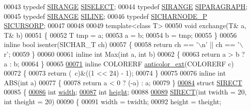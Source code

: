 \begin{DoxyCode}
00043 \textcolor{keyword}{typedef} \hyperlink{struct_s_i_r_a_n_g_e}{SIRANGE} \hyperlink{struct_s_i_r_a_n_g_e}{SISELECT};
00044 \textcolor{keyword}{typedef} \hyperlink{struct_s_i_r_a_n_g_e}{SIRANGE} \hyperlink{struct_s_i_r_a_n_g_e}{SIPARAGRAPH};
00045 \textcolor{keyword}{typedef} \hyperlink{struct_s_i_r_a_n_g_e}{SIRANGE} \hyperlink{struct_s_i_r_a_n_g_e}{SILINE};
00046 \textcolor{keyword}{typedef} \hyperlink{class_s_i_c_h_a_r_n_o_d_e}{SICHARNODE\_P} \hyperlink{class_s_i_c_h_a_r_n_o_d_e}{SICURSORP};
00047 
00048 
00049 \textcolor{keyword}{template}<\textcolor{keyword}{class} T>
00050 \textcolor{keywordtype}{void} exchange(T& a, T& b)
00051 \{
00052     T tmp = a;
00053     a = b;
00054     b = tmp;
00055 \}
00056 \textcolor{keyword}{inline} \textcolor{keywordtype}{bool} isenter(SICHAR\_T ch)
00057 \{
00058     \textcolor{keywordflow}{return} ch == \textcolor{charliteral}{'\(\backslash\)n'} || ch == \textcolor{charliteral}{'\(\backslash\)r'};
00059 \}
00060 
00061 \textcolor{keyword}{inline} \textcolor{keywordtype}{int} Max(\textcolor{keywordtype}{int} a, \textcolor{keywordtype}{int} b)
00062 \{
00063     \textcolor{keywordflow}{return} a > b ? a : b;
00064 \}
00065 
\hyperlink{kernal_8h_abd07a7735390aea7bf376c2bcc75bd96}{00071} \textcolor{keyword}{inline} COLORERF \hyperlink{kernal_8h_abd07a7735390aea7bf376c2bcc75bd96}{anticolor\_ext}(COLORERF c)
00072 \{
00073     \textcolor{keywordflow}{return} (~c)&((1 << 24) - 1);
00074 \}
00075 
00076 \textcolor{keyword}{inline} \textcolor{keywordtype}{int} ABS(\textcolor{keywordtype}{int} a)
00077 \{
00078     \textcolor{keywordflow}{return} a < 0 ? (-a) : a;
00079 \}
\hyperlink{struct_s_i_r_e_c_t}{00084} \textcolor{keyword}{struct }\hyperlink{struct_s_i_r_e_c_t}{SIRECT}
00085 \{
\hyperlink{struct_s_i_r_e_c_t_a99dbd77d045cc587f0c1f40bbba99ac8}{00086}     \textcolor{keywordtype}{int} \hyperlink{struct_s_i_r_e_c_t_a99dbd77d045cc587f0c1f40bbba99ac8}{width}; 
\hyperlink{struct_s_i_r_e_c_t_a6577f3092897d4bef17aab5ec4d62819}{00087}     \textcolor{keywordtype}{int} \hyperlink{struct_s_i_r_e_c_t_a6577f3092897d4bef17aab5ec4d62819}{height};   
00088 
\hyperlink{struct_s_i_r_e_c_t_a845bf8054bfcbdf5336798f61d220d05}{00089}     \hyperlink{struct_s_i_r_e_c_t_a845bf8054bfcbdf5336798f61d220d05}{SIRECT}(\textcolor{keywordtype}{int} twidth = 20, \textcolor{keywordtype}{int} theight = 20) 
00090     \{
00091         width = twidth;
00092         height = theight;

\end{DoxyCode}
